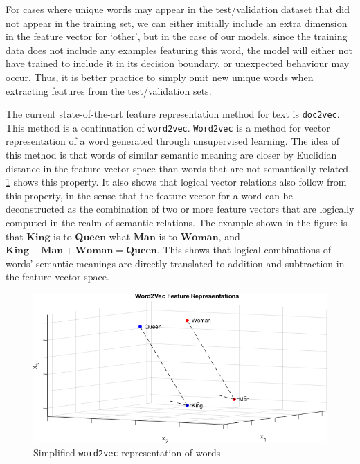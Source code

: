 \documentclass[12pt,a4paper,twoside,openright]{report}
\renewcommand{\vec}[1]{\mathbf{#1}}
\begin{document}

For cases where unique words may appear in the test/validation
dataset that did not appear in the training set, we can either initially include an extra dimension in the feature
vector for `other', but in the case of our models, since the training data does not include any examples featuring
this word, the model will either not have trained to include it in its decision boundary, or unexpected
behaviour may occur. Thus, it is better practice to simply omit new unique words when extracting features
from the test/validation sets.

The current state-of-the-art feature representation method for text is \texttt{doc2vec}\cite{Le14}.
This method is a continuation of \texttt{word2vec}\cite{Mikolov13}. \texttt{Word2vec} is a method
for vector representation of a word generated through unsupervised learning. The idea of this method
is that words of similar semantic meaning are closer by Euclidian distance in the feature vector space than
words that are not semantically related. \cref{fig:word2vec} shows this property. It also shows that logical vector relations 
also follow from this property, in the sense that the feature vector for a word can be deconstructed as the
combination of two or more feature vectors that are logically computed in the realm of semantic relations.
The example shown in the figure is that $\vec{King}$ is to $\vec{Queen}$ what $\vec{Man}$ is to $\vec{Woman}$,
and $\vec{King} - \vec{Man} + \vec{Woman} = \vec{Queen}$. This shows that
logical combinations of words' semantic meanings are directly translated to addition and subtraction in
the feature vector space.

\begin{figure}[H]
\centering
\vspace{10pt}
\includegraphics[width=\textwidth]{word2vec.png}
\caption{Simplified \texttt{word2vec} representation of words}
\label{fig:word2vec}
\end{figure}
\end{document}
